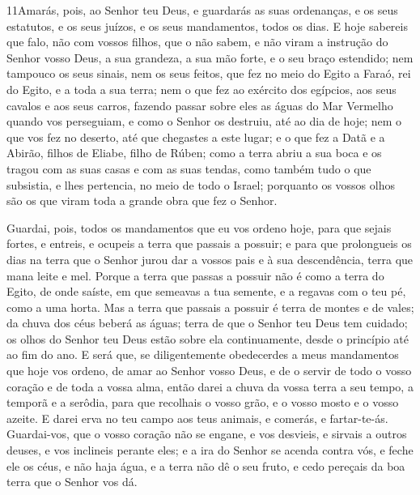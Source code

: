 \medskip

\lettrine{11} Amarás, pois, ao Senhor teu Deus, e guardarás as
suas ordenanças, e os seus estatutos, e os seus juízos, e os seus
mandamentos, todos os dias. E hoje sabereis que falo, não com
vossos filhos, que o não sabem, e não viram a instrução do Senhor
vosso Deus, a sua grandeza, a sua mão forte, e o seu braço
estendido; nem tampouco os seus sinais, nem os seus feitos, que
fez no meio do Egito a Faraó, rei do Egito, e a toda a sua terra;
nem o que fez ao exército dos egípcios, aos seus cavalos e aos
seus carros, fazendo passar sobre eles as águas do Mar Vermelho
quando vos perseguiam, e como o Senhor os destruiu, até ao dia de
hoje; nem o que vos fez no deserto, até que chegastes a este
lugar; e o que fez a Datã e a Abirão, filhos de Eliabe, filho de
Rúben; como a terra abriu a sua boca e os tragou com as suas casas e
com as suas tendas, como também tudo o que subsistia, e lhes
pertencia, no meio de todo o Israel; porquanto os vossos olhos
são os que viram toda a grande obra que fez o Senhor.

Guardai, pois, todos os mandamentos que eu vos ordeno hoje, para
que sejais fortes, e entreis, e ocupeis a terra que passais a
possuir; e para que prolongueis os dias na terra que o Senhor
jurou dar a vossos pais e à sua descendência, terra que mana leite e
mel. Porque a terra que passas a possuir não é como a terra
do Egito, de onde saíste, em que semeavas a tua semente, e a regavas
com o teu pé, como a uma horta. Mas a terra que passais a
possuir é terra de montes e de vales; da chuva dos céus beberá as
águas; terra de que o Senhor teu Deus tem cuidado; os olhos
do Senhor teu Deus estão sobre ela continuamente, desde o princípio
até ao fim do ano. E será que, se diligentemente obedecerdes
a meus mandamentos que hoje vos ordeno, de amar ao Senhor vosso
Deus, e de o servir de todo o vosso coração e de toda a vossa alma,
então darei a chuva da vossa terra a seu tempo, a temporã e a
serôdia, para que recolhais o vosso grão, e o vosso mosto e o vosso
azeite. E darei erva no teu campo aos teus animais, e
comerás, e fartar-te-ás. Guardai-vos, que o vosso coração não
se engane, e vos desvieis, e sirvais a outros deuses, e vos
inclineis perante eles; e a ira do Senhor se acenda contra
vós, e feche ele os céus, e não haja água, e a terra não dê o seu
fruto, e cedo pereçais da boa terra que o Senhor vos dá.

